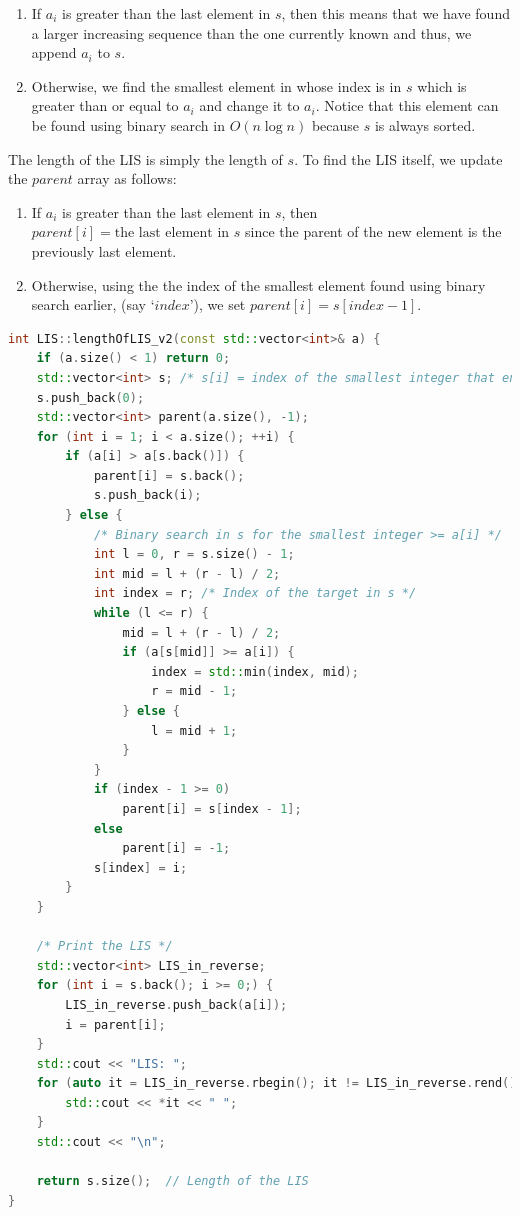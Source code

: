 \documentclass[12pt, a4paper]{article}
\theoremstyle{definition}
\theoremstyle{remark}
\begin{document}
\begin{enumerate}
    \item If $a_i$ is greater than the last element in $s$, then this means that we have found a larger increasing sequence than the one currently known and thus, we append $a_i$ to $s$.
    \item Otherwise, we find the smallest element in whose index is in $s$ which is greater than or equal to $a_i$ and change it to $a_i$. Notice that this element can be found using binary search in $O(n \log n)$ because $s$ is always sorted.
\end{enumerate}
The length of the LIS is simply the length of $s$. To find the LIS itself, we update the $parent$ array as follows:
\begin{enumerate}
    \item If $a_i$ is greater than the last element in $s$, then $parent[i] = \text{the last element in } s$ since the parent of the new element is the previously last element.
    \item Otherwise, using the the index of the smallest element found using binary search earlier, (say `$index$'), we set $parent[i] = s[index - 1]$.
\end{enumerate}

\begin{lstlisting}[language=C++]
int LIS::lengthOfLIS_v2(const std::vector<int>& a) {
    if (a.size() < 1) return 0;
    std::vector<int> s; /* s[i] = index of the smallest integer that ends an increasing sequence of length i */
    s.push_back(0);
    std::vector<int> parent(a.size(), -1);
    for (int i = 1; i < a.size(); ++i) {
        if (a[i] > a[s.back()]) {
            parent[i] = s.back();
            s.push_back(i);
        } else {
            /* Binary search in s for the smallest integer >= a[i] */
            int l = 0, r = s.size() - 1;
            int mid = l + (r - l) / 2;
            int index = r; /* Index of the target in s */
            while (l <= r) {
                mid = l + (r - l) / 2;
                if (a[s[mid]] >= a[i]) {
                    index = std::min(index, mid);
                    r = mid - 1;
                } else {
                    l = mid + 1;
                }
            }
            if (index - 1 >= 0)
                parent[i] = s[index - 1];
            else
                parent[i] = -1;
            s[index] = i;
        }
    }

    /* Print the LIS */
    std::vector<int> LIS_in_reverse;
    for (int i = s.back(); i >= 0;) {
        LIS_in_reverse.push_back(a[i]);
        i = parent[i];
    }
    std::cout << "LIS: ";
    for (auto it = LIS_in_reverse.rbegin(); it != LIS_in_reverse.rend(); ++it) {
        std::cout << *it << " ";
    }
    std::cout << "\n";

    return s.size();  // Length of the LIS
}
\end{lstlisting}
\end{document}
